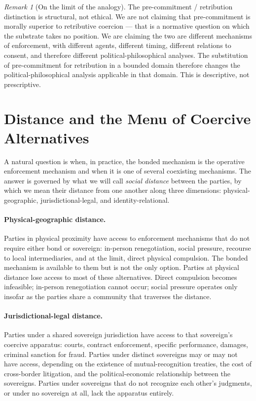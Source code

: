 \documentclass[11pt,a4paper]{article}
\theoremstyle{remark}
\newtheorem{remark}{Remark}[section]
\begin{document}
\begin{remark}[On the limit of the analogy]
The pre-commitment / retribution distinction is structural,
not ethical. We are not claiming that pre-commitment is morally
superior to retributive coercion --- that is a normative
question on which the substrate takes no position. We are
claiming the two are different mechanisms of enforcement, with
different agents, different timing, different relations to
consent, and therefore different political-philosophical
analyses. The substitution of pre-commitment for retribution in
a bounded domain therefore changes the political-philosophical
analysis applicable in that domain. This is descriptive, not
prescriptive.
\end{remark}

\section{Distance and the Menu of Coercive Alternatives}
\label{sec:distance}

A natural question is when, in practice, the bonded mechanism is
the operative enforcement mechanism and when it is one of several
coexisting mechanisms. The answer is governed by what we will
call \emph{social distance} between the parties, by which we
mean their distance from one another along three dimensions:
physical-geographic, jurisdictional-legal, and
identity-relational.

\paragraph{Physical-geographic distance.}
Parties in physical proximity have access to enforcement
mechanisms that do not require either bond or sovereign:
in-person renegotiation, social pressure, recourse to local
intermediaries, and at the limit, direct physical compulsion.
The bonded mechanism is available to them but is not the only
option. Parties at physical distance lose access to most of these
alternatives. Direct compulsion becomes infeasible; in-person
renegotiation cannot occur; social pressure operates only insofar
as the parties share a community that traverses the distance.

\paragraph{Jurisdictional-legal distance.}
Parties under a shared sovereign jurisdiction have access to
that sovereign's coercive apparatus: courts, contract
enforcement, specific performance, damages, criminal sanction
for fraud. Parties under distinct sovereigns may or may not have
access, depending on the existence of mutual-recognition
treaties, the cost of cross-border litigation, and the
political-economic relationship between the sovereigns. Parties
under sovereigns that do not recognize each other's judgments,
or under no sovereign at all, lack the apparatus entirely.
\end{document}
